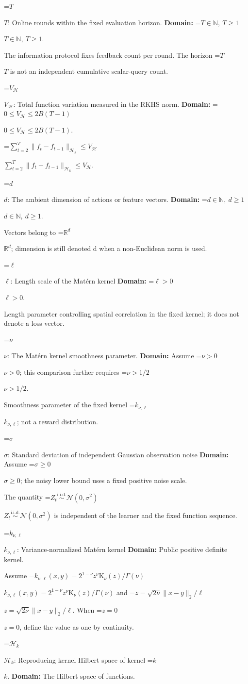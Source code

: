 \documentclass[10pt,a4paper]{article}
\newcommand{\AtlasMath}[1]{\par\begingroup\centering\setbox0=\hbox{$\displaystyle #1$}\ifdim\wd0>1.4\linewidth\typeout{ATLAS WIDE FORMULA: \the\wd0}\fi\ifdim\wd0>\linewidth\resizebox{\linewidth}{!}{\box0}\else\box0\fi\par\endgroup}
\newcommand{\AtlasInlineMath}[1]{\begingroup\setbox0=\hbox{$#1$}\ifdim\wd0>.4\linewidth\endgroup\AtlasMath{#1}\else\endgroup$#1$\fi}
\begin{document}
\AtlasInlineMath{T}: Online rounds within the fixed evaluation horizon. \textbf{Domain:} \AtlasInlineMath{T\in\mathbb N,\ T\ge1}.

The information protocol fixes feedback count per round. The horizon \AtlasInlineMath{T} is not an independent cumulative scalar-query count.

\AtlasInlineMath{V_{\mathcal H}}: Total function variation measured in the RKHS norm. \textbf{Domain:} \AtlasInlineMath{0\le V_{\mathcal H}\le2B(T-1)}.

\AtlasInlineMath{\sum_{t=2}^T\|f_t-f_{t-1}\|_{\mathcal H_k}\le V_{\mathcal H}}.

\AtlasInlineMath{d}: The ambient dimension of actions or feature vectors. \textbf{Domain:} \AtlasInlineMath{d\in\mathbb N,\ d\ge1}.

Vectors belong to \AtlasInlineMath{\mathbb R^d}; dimension is still denoted d when a non-Euclidean norm is used.

\AtlasInlineMath{\ell}: Length scale of the Matérn kernel \textbf{Domain:} \AtlasInlineMath{\ell>0}.

Length parameter controlling spatial correlation in the fixed kernel; it does not denote a loss vector.

\AtlasInlineMath{\nu}: The Matérn kernel smoothness parameter. \textbf{Domain:} Assume \AtlasInlineMath{\nu>0}; this comparison further requires \AtlasInlineMath{\nu>1/2}.

Smoothness parameter of the fixed kernel \AtlasInlineMath{k_{\nu,\ell}}; not a reward distribution.

\AtlasInlineMath{\sigma}: Standard deviation of independent Gaussian observation noise \textbf{Domain:} Assume \AtlasInlineMath{\sigma\ge0}; the noisy lower bound uses a fixed positive noise scale.

The quantity \AtlasInlineMath{Z_t\overset{\mathrm{i.i.d.}}\sim\mathcal N(0,\sigma^2)} is independent of the learner and the fixed function sequence.

\AtlasInlineMath{k_{\nu,\ell}}: Variance-normalized Matérn kernel \textbf{Domain:} Public positive definite kernel.

Assume \AtlasInlineMath{k_{\nu,\ell}(x,y)=2^{1-\nu}z^\nu\mathrm K_\nu(z)/\Gamma(\nu)} and \AtlasInlineMath{z=\sqrt{2\nu}\|x-y\|_2/\ell}. When \AtlasInlineMath{z=0}, define the value as one by continuity.

\AtlasInlineMath{\mathcal H_k}: Reproducing kernel Hilbert space of kernel \AtlasInlineMath{k}. \textbf{Domain:} The Hilbert space of functions.
\end{document}
